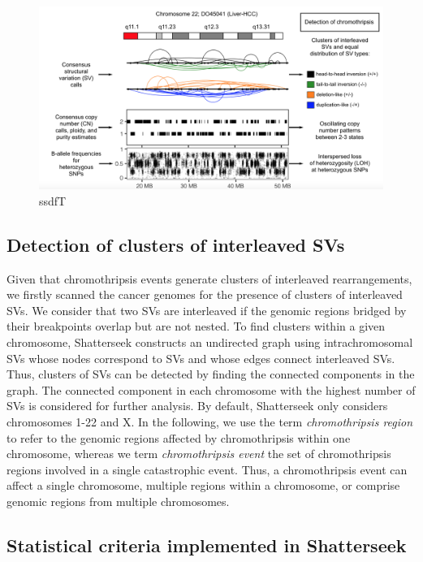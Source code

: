 \documentclass[twoside,a4wide,11pt]{article}\usepackage[]{graphicx}\usepackage[]{color}
\begin{document}
\begin{figure}[htb]
\begin{center}
\includegraphics[width=\textwidth]{workflow_tutorial.png}
\caption{ssdfT}
\end{center}
\end{figure}

\subsection{Detection of clusters of interleaved SVs}

Given that chromothripsis events generate clusters of interleaved rearrangements, 
we firstly scanned the cancer genomes for the presence of clusters of interleaved SVs.
We consider that two SVs are interleaved if the genomic regions bridged by their breakpoints overlap but are not nested. 
To find clusters within a given chromosome, 
Shatterseek constructs an undirected graph using intrachromosomal SVs 
whose nodes correspond to SVs and whose edges connect interleaved SVs. 
Thus, clusters of SVs can be detected by finding the connected components in the graph. 
The connected component in each chromosome with the highest number of SVs is considered for further analysis. 
By default, Shatterseek only considers chromosomes 1-22 and X.
In the following, we use the term {\it chromothripsis region} to refer to the genomic regions affected by chromothripsis within one chromosome, whereas we term {\it chromothripsis event} the set of chromothripsis regions involved in a single catastrophic event.
Thus, a chromothripsis event can affect a single chromosome, multiple regions within a chromosome, or comprise genomic regions from multiple chromosomes.

\subsection{Statistical criteria implemented in Shatterseek}
\end{document}
